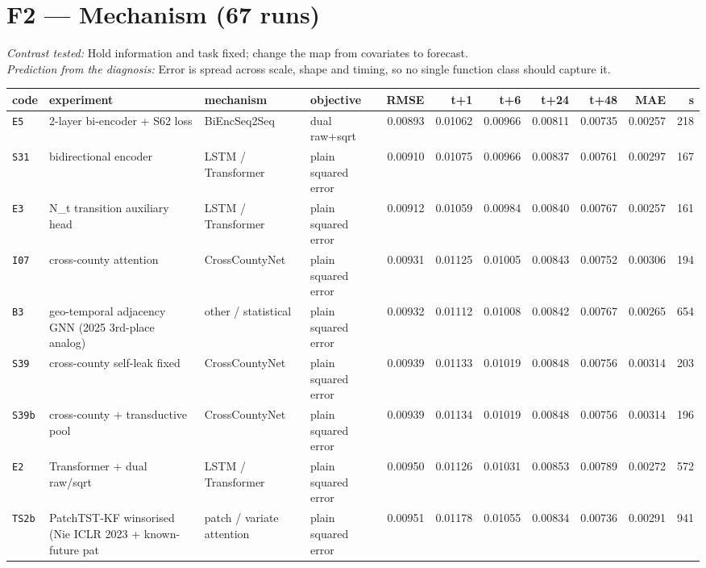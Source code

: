 \documentclass[9pt,landscape]{article}
\begin{document}
\section*{F2 --- Mechanism (67 runs)}
\noindent\emph{Contrast tested:} Hold information and task fixed; change the map from covariates to forecast.\\
\emph{Prediction from the diagnosis:} Error is spread across scale, shape and timing, so no single function class should capture it.
\vspace{2pt}
\begin{longtable}{@{}p{1.1cm}p{5.4cm}p{3.1cm}p{2.7cm}rrrrrrr@{}}
\toprule code & experiment & mechanism & objective & RMSE & t+1 & t+6 & t+24 & t+48 & MAE & s \\ \midrule \endhead
\texttt{E5} & 2-layer bi-encoder + S62 loss & BiEncSeq2Seq & dual raw+sqrt & 0.00893 & 0.01062 & 0.00966 & 0.00811 & 0.00735 & 0.00257 & 218 \\
\texttt{S31} & bidirectional encoder & LSTM / Transformer & plain squared error & 0.00910 & 0.01075 & 0.00966 & 0.00837 & 0.00761 & 0.00297 & 167 \\
\texttt{E3} & N\_t transition auxiliary head & LSTM / Transformer & plain squared error & 0.00912 & 0.01059 & 0.00984 & 0.00840 & 0.00767 & 0.00257 & 161 \\
\texttt{I07} & cross-county attention & CrossCountyNet & plain squared error & 0.00931 & 0.01125 & 0.01005 & 0.00843 & 0.00752 & 0.00306 & 194 \\
\texttt{B3} & geo-temporal adjacency GNN (2025 3rd-place analog) & other / statistical & plain squared error & 0.00932 & 0.01112 & 0.01008 & 0.00842 & 0.00767 & 0.00265 & 654 \\
\rowcolor{gray!15}\texttt{S39} & cross-county self-leak fixed & CrossCountyNet & plain squared error & 0.00939 & 0.01133 & 0.01019 & 0.00848 & 0.00756 & 0.00314 & 203 \\
\texttt{S39b} & cross-county + transductive pool & CrossCountyNet & plain squared error & 0.00939 & 0.01134 & 0.01019 & 0.00848 & 0.00756 & 0.00314 & 196 \\
\texttt{E2} & Transformer + dual raw/sqrt & LSTM / Transformer & plain squared error & 0.00950 & 0.01126 & 0.01031 & 0.00853 & 0.00789 & 0.00272 & 572 \\
\texttt{TS2b} & PatchTST-KF winsorised (Nie ICLR 2023 + known-future pat & patch / variate attention & plain squared error & 0.00951 & 0.01178 & 0.01055 & 0.00834 & 0.00736 & 0.00291 & 941 \\

\end{longtable}
\end{document}
